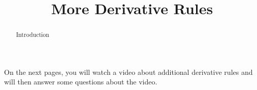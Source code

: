 \documentclass[handout]{ximera}
\title{More Derivative Rules}
\begin{document}
\begin{abstract} Introduction %
\end{abstract}

\maketitle

On the next pages, you will watch a video about additional derivative rules and will then answer some questions about the video.
\end{document}
